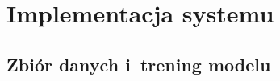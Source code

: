 \chapter{Implementacja systemu}
\label{ch:implementacja}

\section{Zbiór danych i~trening modelu}
\label{sec:zbior-trening}


